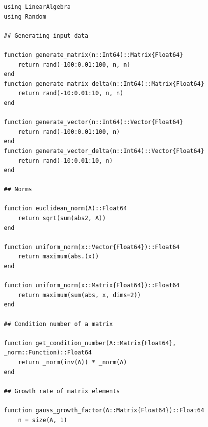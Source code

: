 \documentclass[a4paper, 14pt]{extarticle}
\begin{document}
\begin{figure}[!htb]
\begin{lstlisting}[caption={Реализация алгоритмов оценки источников погрешностей},label={lst:code1}]
using LinearAlgebra
using Random

## Generating input data

function generate_matrix(n::Int64)::Matrix{Float64}
    return rand(-100:0.01:100, n, n)
end
function generate_matrix_delta(n::Int64)::Matrix{Float64}
    return rand(-10:0.01:10, n, n)
end

function generate_vector(n::Int64)::Vector{Float64}
    return rand(-100:0.01:100, n)
end
function generate_vector_delta(n::Int64)::Vector{Float64}
    return rand(-10:0.01:10, n)
end

## Norms

function euclidean_norm(A)::Float64
    return sqrt(sum(abs2, A))
end

function uniform_norm(x::Vector{Float64})::Float64
    return maximum(abs.(x))
end

function uniform_norm(x::Matrix{Float64})::Float64
    return maximum(sum(abs, x, dims=2))
end

## Condition number of a matrix

function get_condition_number(A::Matrix{Float64}, _norm::Function)::Float64
    return _norm(inv(A)) * _norm(A)
end

## Growth rate of matrix elements

function gauss_growth_factor(A::Matrix{Float64})::Float64
    n = size(A, 1)
\end{lstlisting}
\end{figure}
\end{document}
